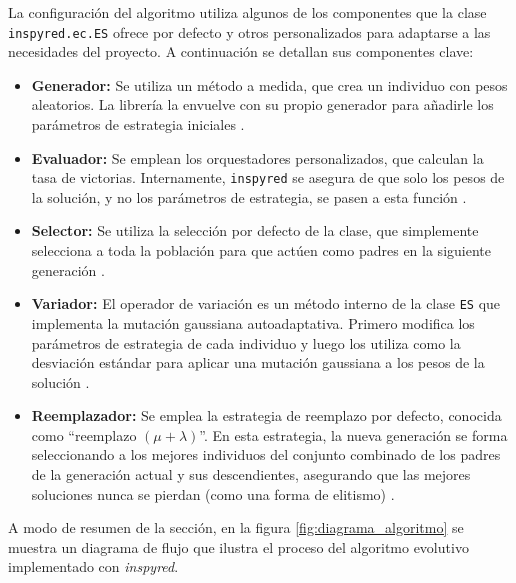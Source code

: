 La configuración del algoritmo utiliza algunos de los componentes que la clase \texttt{inspyred.ec.ES} ofrece por defecto y otros personalizados para adaptarse a las necesidades del proyecto. A continuación se detallan sus componentes clave:
\begin{itemize}
	\item \textbf{Generador:} Se utiliza un método a medida, que crea un individuo con pesos aleatorios. La librería la envuelve con su propio generador para añadirle los parámetros de estrategia iniciales \cite{aaron_garret_library_2025}.
	\item \textbf{Evaluador:} Se emplean los orquestadores personalizados, que calculan la tasa de victorias. Internamente, \texttt{inspyred} se asegura de que solo los pesos de la solución, y no los parámetros de estrategia, se pasen a esta función \cite{aaron_garret_library_2025}.
	\item \textbf{Selector:} Se utiliza la selección por defecto de la clase, que simplemente selecciona a toda la población para que actúen como padres en la siguiente generación \cite{aaron_garret_library_2025}.
	\item \textbf{Variador:} El operador de variación es un método interno de la clase \texttt{ES} que implementa la mutación gaussiana autoadaptativa. Primero modifica los parámetros de estrategia de cada individuo y luego los utiliza como la desviación estándar para aplicar una mutación gaussiana a los pesos de la solución \cite{aaron_garret_library_2025}.
	\item \textbf{Reemplazador:} Se emplea la estrategia de reemplazo por defecto, conocida como ``reemplazo $(\mu + \lambda)$''. En esta estrategia, la nueva generación se forma seleccionando a los mejores individuos del conjunto combinado de los padres de la generación actual y sus descendientes, asegurando que las mejores soluciones nunca se pierdan (como una forma de elitismo) \cite{aaron_garret_library_2025}.
\end{itemize}

A modo de resumen de la sección, en la figura \ref{fig:diagrama_algoritmo} se muestra un diagrama de flujo que ilustra el proceso del algoritmo evolutivo implementado con \textit{inspyred}.

